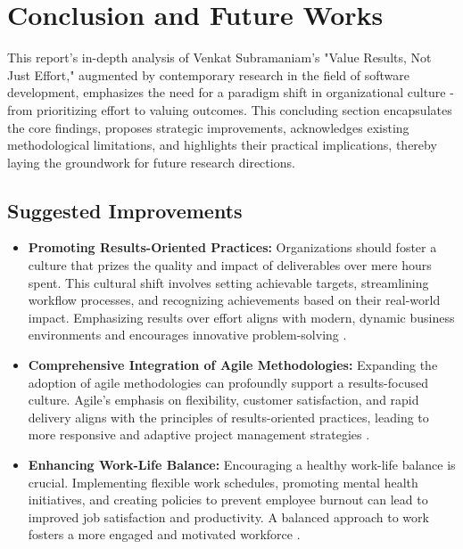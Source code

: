 \documentclass{article}
\begin{document}
\newpage
\section{Conclusion and Future Works}

This report's in-depth analysis of Venkat Subramaniam's "Value Results, Not Just Effort," augmented by contemporary research in the field of software development, emphasizes the need for a paradigm shift in organizational culture - from prioritizing effort to valuing outcomes. This concluding section encapsulates the core findings, proposes strategic improvements, acknowledges existing methodological limitations, and highlights their practical implications, thereby laying the groundwork for future research directions.

\subsection{Suggested Improvements}
\begin{itemize}
    \item \textbf{Promoting Results-Oriented Practices:} Organizations should foster a culture that prizes the quality and impact of deliverables over mere hours spent. This cultural shift involves setting achievable targets, streamlining workflow processes, and recognizing achievements based on their real-world impact. Emphasizing results over effort aligns with modern, dynamic business environments and encourages innovative problem-solving \cite{WagnerDeissenboeck2019}.
    
    \item \textbf{Comprehensive Integration of Agile Methodologies:} Expanding the adoption of agile methodologies can profoundly support a results-focused culture. Agile's emphasis on flexibility, customer satisfaction, and rapid delivery aligns with the principles of results-oriented practices, leading to more responsive and adaptive project management strategies \cite{Saeed2019SoftwareDevelopment}.
    
    \item \textbf{Enhancing Work-Life Balance:} Encouraging a healthy work-life balance is crucial. Implementing flexible work schedules, promoting mental health initiatives, and creating policies to prevent employee burnout can lead to improved job satisfaction and productivity. A balanced approach to work fosters a more engaged and motivated workforce \cite{Dhas2015WorkLifeBalance}.
\end{itemize}
\end{document}
